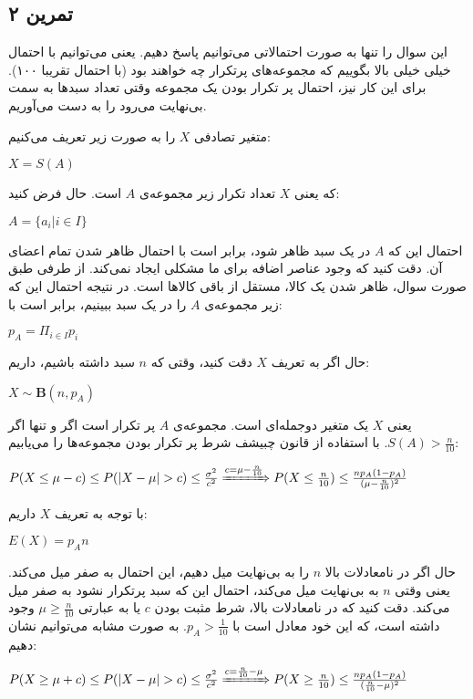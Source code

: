 \documentclass[a4paper,12pt]{article}
\newcommand{\problem}[1]
{
	\subsection*{
		تمرین
		#1
	}
}
\begin{document}
\problem{۲}

این سوال را تنها به صورت احتمالاتی می‌توانیم پاسخ دهیم. یعنی می‌توانیم با احتمال خیلی خیلی بالا بگوییم که 
مجموعه‌های پرتکرار چه خواهند بود (با احتمال تقریبا ۱۰۰). برای این کار نیز، احتمال پر تکرار بودن یک مجموعه وقتی 
تعداد سبد‌ها به سمت بی‌نهایت می‌رود را به دست می‌آوریم. 

متغیر تصادفی 
$X$
را به صورت زیر تعریف می‌کنیم: 

\begin{LTR}
$X = S(A)$
\end{LTR}
که یعنی 
$X$
تعداد تکرار زیر مجموعه‌ی 
$A$
است. حال فرض کنید: 
\begin{LTR}
$A = \{ a_i | i \in I \}$
\end{LTR}
احتمال این که 
$A$
در یک سبد ظاهر شود، برابر است با احتمال ظاهر شدن تمام اعضای آن. دقت کنید که وجود عناصر اضافه برای ما مشکلی ایجاد نمی‌کند. از طرفی طبق صورت سوال، ظاهر 
شدن یک کالا، مستقل از باقی کالاها است. در نتیجه احتمال این که زیر مجموعه‌ی 
$A$
را در یک سبد ببینیم، برابر است با:
\begin{LTR}
$p_A = \Pi_{i \in I} p_i$
\end{LTR}
حال اگر به تعریف 
$X$
دقت کنید، وقتی که 
$n$
سبد داشته باشیم، داریم:
\begin{LTR}
$X \sim \mathbf{B}(n,p_A) $ 
\end{LTR}
یعنی 
$X$
یک متغیر دوجمله‌ای است. مجموعه‌ی 
$A$
پر تکرار است اگر و تنها اگر 
$S(A) > \frac{n}{10}$. 
با استفاده از قانون چبیشف شرط پر تکرار بودن مجموعه‌ها را می‌یابیم:

\begin{LTR}
$P(X \leq \mu - c) \leq P(|X-\mu|>c) \leq \frac{\sigma^2}{c^2} \xRightarrow{c = \mu - \frac{n}{10}}  
P(X \leq \frac{n}{10}) \leq \frac{np_A(1-p_A)}{(\mu - \frac{n}{10})^2}
$
\end{LTR}

با توجه به تعریف 
$X$
داریم:
\begin{LTR}
$E(X) = p_A n$
\end{LTR}


حال اگر در نامعادلات بالا
$n$
را به بی‌نهایت میل دهیم، این احتمال به صفر میل می‌کند. یعنی وقتی 
$n$
به بی‌نهایت میل می‌کند، احتمال این که سبد پرتکرار نشود به صفر میل می‌کند. دقت کنید که در نامعادلات بالا، شرط مثبت 
بودن 
$c$
یا به عبارتی
$\mu \geq \frac{n}{10}$
وجود داشته است، که این خود معادل است با 
$p_A > \frac{1}{10}$.
 به صورت مشابه می‌توانیم نشان دهیم: 
\begin{LTR}
$P(X \geq \mu + c) \leq P(|X-\mu|>c) \leq \frac{\sigma^2}{c^2} \xRightarrow{c = \frac{n}{10} - \mu }  
P(X \geq \frac{n}{10}) \leq \frac{np_A(1-p_A)}{(\frac{n}{10} - \mu)^2}
$
\end{LTR}
\end{document}
